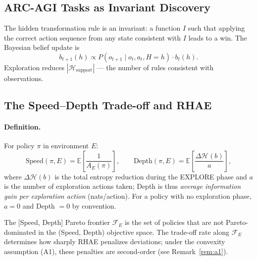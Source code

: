 \documentclass[11pt]{article}
\newtheorem{proposition}{Proposition}
\begin{document}
\subsection{ARC-AGI Tasks as Invariant Discovery}

The hidden transformation rule is an invariant: a function $I$ such that applying the correct action sequence from any state consistent with $I$ leads to a win. The Bayesian belief update is
\begin{equation}
b_{t+1}(h) \propto P(o_{t+1} \mid o_t, a_t, H=h) \cdot b_t(h).
\end{equation}
Exploration reduces $|\mathcal{H}_\text{support}|$ --- the number of rules consistent with observations.

\subsection{The Speed--Depth Trade-off and RHAE}

\paragraph{Definition.} For policy $\pi$ in environment $E$:
\begin{equation}
\text{Speed}(\pi, E) = \mathbb{E}\!\left[\frac{1}{A_E(\pi)}\right], \qquad
\text{Depth}(\pi, E) = \mathbb{E}\!\left[\frac{\Delta\mathcal{H}(b)}{a}\right],
\label{eq:speed-depth}
\end{equation}
where $\Delta\mathcal{H}(b)$ is the total entropy reduction during the EXPLORE phase and $a$ is the number of exploration actions taken; Depth is thus \emph{average information gain per exploration action} (nats/action). For a policy with no exploration phase, $a{=}0$ and Depth $= 0$ by convention.

The [Speed, Depth] Pareto frontier $\mathcal{F}_E$ is the set of policies that are not Pareto-dominated in the (Speed, Depth) objective space. The trade-off rate along $\mathcal{F}_E$ determines how sharply RHAE penalizes deviations; under the convexity assumption (A1), these penalties are second-order (see Remark~\ref{rem:a1}).

\begin{center}
\end{center}
\end{document}
